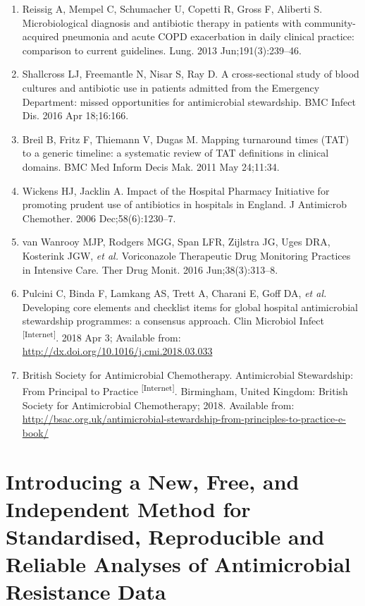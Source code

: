 \documentclass[
]{book}
\begin{document}
\begin{enumerate}
\item
  Reissig A, Mempel C, Schumacher U, Copetti R, Gross F, Aliberti S. Microbiological diagnosis and antibiotic therapy in patients with community-acquired pneumonia and acute COPD exacerbation in daily clinical practice: comparison to current guidelines. Lung. 2013 Jun;191(3):239--46.
\item
  Shallcross LJ, Freemantle N, Nisar S, Ray D. A cross-sectional study of blood cultures and antibiotic use in patients admitted from the Emergency Department: missed opportunities for antimicrobial stewardship. BMC Infect Dis. 2016 Apr 18;16:166.
\item
  Breil B, Fritz F, Thiemann V, Dugas M. Mapping turnaround times (TAT) to a generic timeline: a systematic review of TAT definitions in clinical domains. BMC Med Inform Decis Mak. 2011 May 24;11:34.
\item
  Wickens HJ, Jacklin A. Impact of the Hospital Pharmacy Initiative for promoting prudent use of antibiotics in hospitals in England. J Antimicrob Chemother. 2006 Dec;58(6):1230--7.
\item
  van Wanrooy MJP, Rodgers MGG, Span LFR, Zijlstra JG, Uges DRA, Kosterink JGW, \emph{et al.} Voriconazole Therapeutic Drug Monitoring Practices in Intensive Care. Ther Drug Monit. 2016 Jun;38(3):313--8.
\item
  Pulcini C, Binda F, Lamkang AS, Trett A, Charani E, Goff DA, \emph{et al.} Developing core elements and checklist items for global hospital antimicrobial stewardship programmes: a consensus approach. Clin Microbiol Infect \textsuperscript{{[}Internet{]}}. 2018 Apr 3; Available from: \url{http://dx.doi.org/10.1016/j.cmi.2018.03.033}
\item
  British Society for Antimicrobial Chemotherapy. Antimicrobial Stewardship: From Principal to Practice \textsuperscript{{[}Internet{]}}. Birmingham, United Kingdom: British Society for Antimicrobial Chemotherapy; 2018. Available from: \url{http://bsac.org.uk/antimicrobial-stewardship-from-principles-to-practice-e-book/}
\end{enumerate}

\hypertarget{ch03-introducing-new-method}{%
\chapter{Introducing a New, Free, and Independent Method for Standardised, Reproducible and Reliable Analyses of Antimicrobial Resistance Data}\label{ch03-introducing-new-method}}
\end{document}
